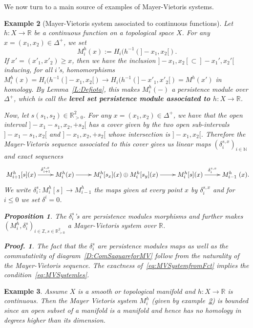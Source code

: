 \documentclass[a4paper, english, 11pt]{article}
\newcommand{\0}{\vec{0}}
\newcommand{\R}[0]{\mathbb{R}}
\newcommand{\N}[0]{\mathbb{N}}
\newcommand{\Z}[0]{\mathbb{Z}}
\newtheorem{prop}{Proposition}[section]
\newtheorem*{pf}{Proof.} }
\newtheorem{ex}[prop]{Example}
\begin{document}
We now turn to a main source of examples of Mayer-Vietoris systems. 
\begin{ex}[Mayer-Vietoris system associated to continuous functions]\label{Ex:MVfromFct}
Let $h: X\to \R$ be a continuous function on a topological space $X$. For any $
x=(x_1,x_2)\in \Delta^+$, we 
 set $$M_i^h(x):= H_i(h^{-1}(]-x_1, x_2[).$$
 If $x'=(x'_1, x'_2)\geq x$, then we have the inclusion $]-x_1, x_2[\subset ]-x_1', x_2'[$ inducing, for all $i$'s, homomorphisms $M_i^h(x)=H_i(h^{-1}(]-x_1, x_2[) \to H_i(h^{-1}(]-x'_1, x'_2[)= M^h(x')$ in homology. 
 By Lemma~\ref{L:Defiota}, this makes $M_i^h(-)$ a persistence module over $\Delta^+$, which is call the \textbf{level set persistence module associated to $h:X\to \R$}. 
 
 \smallskip
 
 Now, let $s(s_1,s_2) \in \R^2_{>0}$. For any $x=(x_1,x_2)\in \Delta^+$, we have that the open interval $]-x_1-s_1, x_2,+s_2[ $ has a cover given by the two open sub-intervals $]-x_1-s_1, x_2[$ and $]-x_1, x_2,+s_2[ $ whose intersection is $]-x_1, x_2[$. Therefore the Mayer-Vietoris sequence associated to this cover gives us linear maps $(\delta_{i}^{s,x})_{i\in \N}$ and exact sequences 
  \begin{equation}\xymatrix{M^h_{i+1}[s](x) \ar[r]^-{\delta_{i+1}^{s,x}} & M^h_i(x) \ar[r] & M^h_i[s_x](x) \oplus M^h_i[s_y](x) \ar[r] & M^h_i[s](x) \ar[r]^-{\delta_{i}^{s,x}} & M^h_{i-1}}(x).\label{eq:MVSystemfromFct}\end{equation}
  We write $\delta^s_i: M_i^h[s] \to M_{i-1}^h$ the maps given at every point $x$ by $\delta_i^{s,x}$ and for $i\leq 0$ we set $\delta^i=0$.
  \begin{prop}\label{P:MVfromFct}
  The  $\delta^s_i$'s are persistence modules morphisms and further makes $(M^h_i, \delta^s_i)_{i\in \Z, s\in \R^2_{>0}}$ a Mayer-Vietoris system over $\R$.
  \end{prop}
  \begin{pf}
  The fact that the $\delta^s_i$ are persistence modules maps as well as the commutativity of diagram~\eqref{D:ComSaquareforMV} follow from the naturality of the Mayer-Vietoris sequence. The exactness of~\eqref{eq:MVSystemfromFct} implies the condition~\eqref{eq:MVSystemles}.
  \end{pf}
\end{ex}
\begin{ex}
 Assume $X$ is a smooth or topological manifold and $h: X\to \R$ is continuous. Then the Mayer Vietoris system $M_i^h$ (given by example~\ref{Ex:MVfromFct}) is bounded since an open subset of a manifold is a manifold and hence has no homology in degrees higher than its dimension.  
\end{ex}
\end{document}
